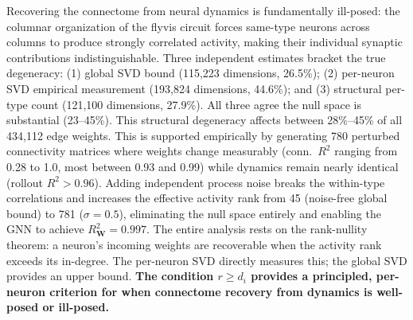 \documentclass[11pt,a4paper]{article}
\begin{document}
Recovering the connectome from neural dynamics is fundamentally ill-posed: the columnar organization of the flyvis circuit forces same-type neurons across columns to produce strongly correlated activity, making their individual synaptic contributions indistinguishable. Three independent estimates bracket the true degeneracy: (1) global SVD bound (115,223 dimensions, 26.5\%); (2) per-neuron SVD empirical measurement (193,824 dimensions, 44.6\%); and (3) structural per-type count (121,100 dimensions, 27.9\%). All three agree the null space is substantial (23--45\%). This structural degeneracy affects between 28\%--45\% of all 434,112 edge weights. This is supported empirically by generating 780 perturbed connectivity matrices where weights change measurably (conn.\ $R^2$ ranging from 0.28 to 1.0, most between 0.93 and 0.99) while dynamics remain nearly identical (rollout $R^2 > 0.96$). Adding independent process noise breaks the within-type correlations and increases the effective activity rank from 45 (noise-free global bound) to 781 ($\sigma = 0.5$), eliminating the null space entirely and enabling the GNN to achieve $R^2_{\mathbf{W}} = 0.997$. The entire analysis rests on the rank-nullity theorem: a neuron's incoming weights are recoverable when the activity rank exceeds its in-degree. The per-neuron SVD directly measures this; the global SVD provides an upper bound. \textbf{The condition $r \geq d_i$ provides a principled, per-neuron criterion for when connectome recovery from dynamics is well-posed or ill-posed.}
\end{document}
